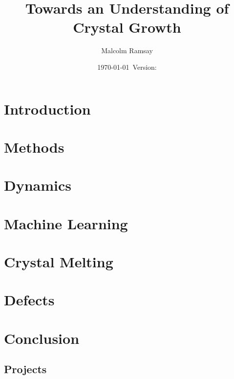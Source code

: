 \documentclass[12pt, a4paper]{report}
\title{Towards an Understanding of Crystal Growth}
\author{Malcolm Ramsay}
\date{\today{}~Version: \version}
\begin{document}
\beforepreface{}
\afterpreface{}

\chapter{Introduction}







\chapter{Methods}




\chapter{Dynamics}




\chapter{Machine Learning}




\chapter{Crystal Melting}




\chapter{Defects}




\chapter{Conclusion}

\printbibliography{}

\begin{appendices}
  \chapter{Projects}
  

\end{appendices}
\end{document}
